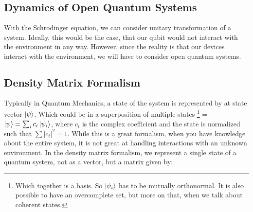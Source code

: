 \begin{fullwidth}
\chapter{Dynamics of Open Quantum Systems} \label{sec: Quantum Maps}
\end{fullwidth}
With the Schrodinger equation, we can consider unitary transformation of a system. Ideally, this would be the case, that our qubit would not interact with the environment in any way. However, since the reality is that our devices interact with the environment, we will have to consider open quantum systems. \\


\section{Density Matrix Formalism}
Typically in Quantum Mechanics, a state of the system is represented by at state vector $\ket{\psi}$. Which could be in a superposition of multiple states \footnote{Which together is a basis. So {$\ket{\psi_i}$} has to be mutually orthonormal. It is also possible to have an overcomplete set, but more on that, when we talk about coherent states.} = $\ket{\psi} = \sum_i c_i\ket{\psi_i}$, where $c_i$ is the complex coefficient and the state is normalized such that $\sum |c_i|^2 = 1$. While this is a great formalism, when you have knowledge about the entire system, it is not great at handling interactions with an unknown environment. 
In the density matrix formalism, we represent a single state of a quantum system, not as a vector, but a matrix given by:

